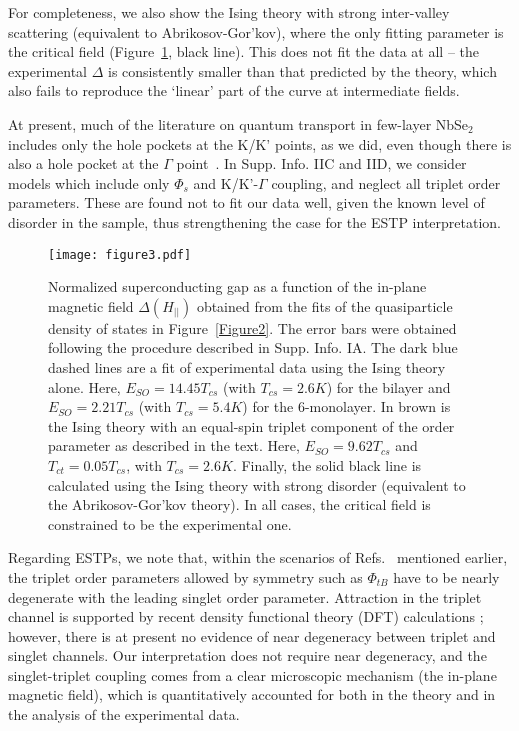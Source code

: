 \documentclass[showpacs,superscriptaddress,preprint,prb]{revtex4}
\begin{document}
For completeness, we also show the Ising theory with strong inter-valley scattering (equivalent to Abrikosov-Gor'kov), where the only fitting parameter is the critical field (Figure~\ref{Figure3}, black line). This does not fit the data at all -- the experimental $\Delta$ is consistently smaller than that predicted by the theory, which also fails to reproduce the `linear' part of the curve at intermediate fields.

At present, much of the literature on quantum transport in few-layer NbSe$_2$ includes only the hole pockets at the K/K' points, as we did, even though there is also a hole pocket at the $\Gamma$ point~\cite{wickramaratne2020}. In Supp. Info. IIC and IID, we consider models which include only $\Phi_s$ and K/K'-$\Gamma$ coupling, and neglect all triplet order parameters. These are found not to fit our data well, given the known level of disorder in the sample, thus strengthening the case for the ESTP interpretation. 

\begin{figure}[h!]
	\texttt{[image: figure3.pdf]}	
	\caption{Normalized superconducting gap as a function of the in-plane magnetic field $\Delta(H_{||})$ obtained from the fits of the quasiparticle density of states in Figure~\ref{Figure2}. The error bars were obtained following the procedure described in Supp. Info. IA. The dark blue dashed lines are a fit of experimental data using the Ising theory alone. Here, $E_{SO}=14.45 T_{cs}$ (with $T_{cs}=2.6K$) for the bilayer and $E_{SO}=2.21 T_{cs}$ (with $T_{cs}=5.4K$) for the 6-monolayer. In brown is the Ising theory with an equal-spin triplet component of the order parameter as described in the text. Here, $E_{SO}=9.62 T_{cs}$ and $T_{ct}=0.05 T_{cs}$, with $T_{cs}=2.6K$. 
	Finally, the solid black line is calculated using the Ising theory with strong disorder (equivalent to the Abrikosov-Gor'kov theory). In all cases, the critical field is constrained to be the experimental one.}
	\label{Figure3}
\end{figure}

Regarding ESTPs, we note that, within the scenarios of Refs.~\cite{Hamill_2020,Cho_Lortz_2020} mentioned earlier, the triplet order parameters allowed by symmetry such as $\Phi_{tB}$ have to be nearly degenerate with the leading singlet order parameter. Attraction in the triplet channel is supported by recent density functional theory (DFT) calculations \cite{wickramaratne2020}; however, there is at present no evidence of near degeneracy between triplet and singlet channels. Our interpretation does not require near degeneracy, and the singlet-triplet coupling comes from a clear microscopic mechanism (the in-plane magnetic field), which is quantitatively accounted for both in the theory and in the analysis of the experimental data.
\end{document}
